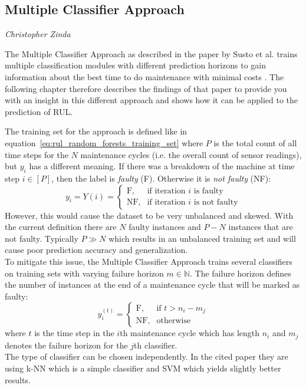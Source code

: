 \subsection{Multiple Classifier Approach}
\vspace*{-12.5mm}\hfill{\normalsize\emph{Christopher Zinda}}
\label{sec:rul_estimation:approaches:multiple_classifier_approach}

The Multiple Classifier Approach as described in the paper by Susto et al. trains multiple classification modules with different prediction horizons to gain information about the best time to do maintenance with minimal costs \cite{DBLP:journals/tii/SustoSPMB15}. The following chapter therefore describes the findings of that paper to provide you with an insight in this different approach and shows how it can be applied to the prediction of RUL.

The training set for the approach is defined like in equation~\ref{eq:rul_random_forests_training_set} where $P$ is the total count of all time steps for the $N$ maintenance cycles (i.e. the overall count of sensor readings), but $y_i$ has a different meaning. If there was a breakdown of the machine at time step $i\in[P]$, then the label is \textit{faulty} (F). Otherwise it is \textit{not faulty} (NF):
\begin{equation}
    y_i = Y(i) = \begin{cases}
        \text{F,}  & \text{if iteration }i\text{ is faulty}     \\
        \text{NF,} & \text{if iteration }i\text{ is not faulty}
    \end{cases}
\end{equation}
However, this would cause the dataset to be very unbalanced and skewed. With the current definition there are $N$ faulty instances and $P-N$ instances that are not faulty. Typically $P\gg N$ which results in an unbalanced training set and will cause poor prediction accuracy and generalization.\\
To mitigate this issue, the Multiple Classifier Approach trains several classifiers on training sets with varying failure horizon $m\in\mathbb{N}$. The failure horizon defines the number of instances at the end of a maintenance cycle that will be marked as faulty:
\begin{equation}
    y_i^{(t)} = \begin{cases}
        \text{F,}  & \text{if }t > n_i - m_j \\
        \text{NF,} & \text{otherwise}
    \end{cases}
\end{equation}
where $t$ is the time step in the $i$th maintenance cycle which has length $n_i$ and $m_j$ denotes the failure horizon for the $j$th classifier.\\
The type of classifier can be chosen independently. In the cited paper they are using k-NN which is a simple classifier and SVM which yields slightly better results.

